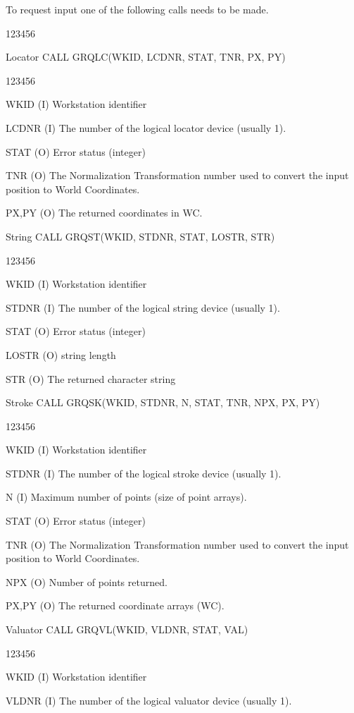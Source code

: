 To request input one of the following calls needs to be made.
\begin{DLtt}{123456}
\item[Locator]CALL GRQLC(WKID, LCDNR, STAT, TNR, PX, PY)
\begin{DLtt}{123456}
\item[WKID](I) Workstation identifier
\item[LCDNR](I) The number of the logical locator device (usually 1).
\item[STAT](O) Error status (integer)
\item[TNR](O) The Normalization Transformation number used to
convert the input position to World Coordinates.
\item[PX,PY](O) The returned coordinates in WC.
\end{DLtt}
\item[String]CALL GRQST(WKID, STDNR, STAT, LOSTR, STR)
\begin{DLtt}{123456}
\item[WKID](I) Workstation identifier
\item[STDNR](I) The number of the logical string device (usually 1).
\item[STAT](O) Error status (integer)
\item[LOSTR](O) string length
\item[STR](O) The returned character string
\end{DLtt}
\item[Stroke]CALL GRQSK(WKID, STDNR, N, STAT, TNR, NPX, PX, PY)
\begin{DLtt}{123456}
\item[WKID](I) Workstation identifier
\item[STDNR](I) The number of the logical stroke device (usually 1).
\item[N](I) Maximum number of points (size of point arrays).
\item[STAT](O) Error status (integer)
\item[TNR](O) The Normalization Transformation number used to
convert the input position to World Coordinates.
\item[NPX](O) Number of points returned.
\item[PX,PY](O) The returned coordinate arrays (WC).
\end{DLtt}
\item[Valuator]CALL GRQVL(WKID, VLDNR, STAT, VAL)
\begin{DLtt}{123456}
\item[WKID](I) Workstation identifier
\item[VLDNR](I) The number of the logical valuator device (usually 1).

\end{DLtt}
\end{DLtt}
